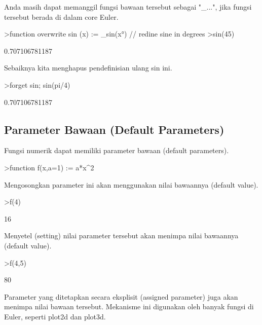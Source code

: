 \documentclass{article}
\newenvironment{eulernotebook}{\par}{\par}
\newcommand{\eulersubheading}[1]{\subsection{#1}}
\newenvironment{eulercomment}{\par\medskip}{\par\medskip}
\begin{document}
\begin{eulernotebook}
\begin{eulercomment}
\begin{eulercomment}
\begin{eulercomment}
Anda masih dapat memanggil fungsi bawaan tersebut sebagai "\_...", jika
fungsi tersebut berada di dalam core Euler.
\end{eulercomment}
\begin{eulerprompt}
>function overwrite sin (x) := _sin(x°) // redine sine in degrees
>sin(45)
\end{eulerprompt}
\begin{euleroutput}
  0.707106781187
\end{euleroutput}
\begin{eulercomment}
Sebaiknya kita menghapus pendefinisian ulang sin ini.
\end{eulercomment}
\begin{eulerprompt}
>forget sin; sin(pi/4)
\end{eulerprompt}
\begin{euleroutput}
  0.707106781187
\end{euleroutput}
\eulersubheading{Parameter Bawaan (Default Parameters)}
\begin{eulercomment}
Fungsi numerik dapat memiliki parameter bawaan (default parameters).
\end{eulercomment}
\begin{eulerprompt}
>function f(x,a=1) := a*x^2
\end{eulerprompt}
\begin{eulercomment}
Mengosongkan parameter ini akan menggunakan nilai bawaannya (default
value).
\end{eulercomment}
\begin{eulerprompt}
>f(4)
\end{eulerprompt}
\begin{euleroutput}
  16
\end{euleroutput}
\begin{eulercomment}
Menyetel (setting) nilai parameter tersebut akan menimpa nilai
bawaannya (default value).
\end{eulercomment}
\begin{eulerprompt}
>f(4,5)
\end{eulerprompt}
\begin{euleroutput}
  80
\end{euleroutput}
\begin{eulercomment}
Parameter yang ditetapkan secara eksplisit (assigned parameter) juga
akan menimpa nilai bawaan tersebut. Mekanisme ini digunakan oleh
banyak fungsi di Euler, seperti plot2d dan plot3d.
\end{eulercomment}
\begin{eulerprompt}

\end{eulerprompt}
\end{eulercomment}
\end{eulercomment}
\end{eulernotebook}
\end{document}
